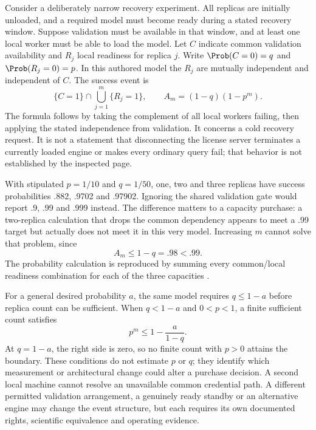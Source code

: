 Consider a deliberately narrow recovery experiment. All replicas are initially
unloaded, and a required model must become ready during a stated recovery
window. Suppose validation must be available in that window, and at least one
local worker must be able to load the model. Let $C$ indicate common validation
availability and $R_j$ local readiness for replica $j$. Write
$\Prob(C=0)=q$ and $\Prob(R_j=0)=p$. In this authored model the $R_j$ are
mutually independent and independent of $C$. The success event is
\begin{equation}
 \{C=1\}\cap\bigcup_{j=1}^m\{R_j=1\},\qquad
 A_m=(1-q)(1-p^m).
 \label{exec17:s8-common-recovery}
\end{equation}
The formula follows by taking the complement of all local workers failing,
then applying the stated independence from validation. It concerns a cold
recovery request. It is not a statement that disconnecting the license server
terminates a currently loaded engine or makes every ordinary query fail;
that behavior is not established by the inspected page.

With stipulated $p=1/10$ and $q=1/50$, one, two and three replicas have success
probabilities .882, .9702 and .97902. Ignoring the shared validation gate would
report .9, .99 and .999 instead. The difference matters to a capacity purchase:
a two-replica calculation that drops the common dependency appears to meet a
.99 target but actually does not meet it in this very model. Increasing $m$
cannot solve that problem, since
\begin{equation}
 A_m\leq1-q=.98<.99.
 \label{exec17:s8-recovery-ceiling}
\end{equation}
The probability calculation is reproduced by summing every common/local
readiness combination for each of the three capacities
\citep{exec17_s8_availability}.

For a general desired probability $a$, the same model requires
$q\leq1-a$ before replica count can be sufficient. When $q<1-a$ and
$0<p<1$, a finite sufficient count satisfies
\begin{equation}
 p^m\leq1-\frac{a}{1-q}.
 \label{exec17:s8-recovery-condition}
\end{equation}
At $q=1-a$, the right side is zero, so no finite count with $p>0$ attains
the boundary. These conditions do not estimate $p$ or $q$; they identify which
measurement or architectural change could alter a purchase decision. A second
local machine cannot resolve an unavailable common credential path. A different
permitted validation arrangement, a genuinely ready standby or an alternative
engine may change the event structure, but each requires its own documented
rights, scientific equivalence and operating evidence.

